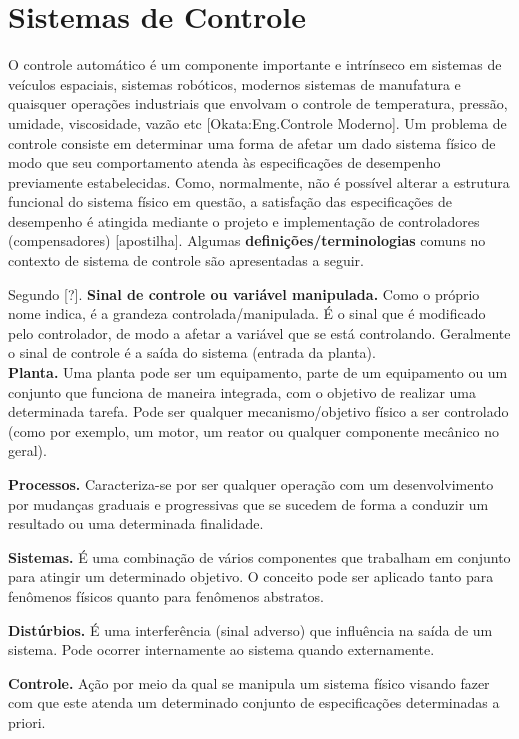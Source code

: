 \section{Sistemas de Controle}

O controle automático é um componente importante e intrínseco em sistemas de veículos espaciais, sistemas robóticos, modernos sistemas de manufatura e quaisquer operações industriais que envolvam o controle de temperatura, pressão, umidade, viscosidade, vazão etc [Okata:Eng.Controle Moderno]. Um problema de controle consiste em determinar uma forma de afetar um dado sistema físico de modo que seu comportamento atenda às especificações de desempenho previamente estabelecidas. Como, normalmente, não é possível alterar a estrutura funcional do sistema físico em questão, a satisfação das especificações de desempenho é atingida mediante o projeto e implementação de controladores (compensadores) [apostilha]. Algumas \textbf{definições/terminologias} comuns no contexto de sistema de controle são apresentadas a seguir.

Segundo [?].
\textbf{Sinal de controle ou variável manipulada.} Como o próprio nome indica, é a grandeza controlada/manipulada. É o sinal que é modificado pelo controlador, de modo a afetar a variável que se está controlando. Geralmente o sinal de controle é a saída do sistema (entrada da planta).\\

\textbf{Planta.} Uma planta pode ser um equipamento, parte de um equipamento ou um conjunto que funciona de maneira integrada, com o objetivo de realizar uma determinada tarefa. Pode ser qualquer mecanismo/objetivo físico a ser controlado (como por exemplo, um motor, um reator ou qualquer componente mecânico no geral).

\textbf{Processos.} Caracteriza-se por ser qualquer operação com um desenvolvimento por mudanças graduais e progressivas que se sucedem de forma a conduzir um resultado ou uma determinada finalidade.

\textbf{Sistemas.} É uma combinação de vários componentes que trabalham em conjunto para atingir um determinado objetivo. O conceito pode ser aplicado tanto para fenômenos físicos quanto para fenômenos abstratos.

\textbf{Distúrbios.} É uma interferência (sinal adverso) que influência na saída de um sistema. Pode ocorrer internamente ao sistema quando externamente.


\textbf{Controle.} Ação por meio da qual se manipula um sistema físico visando fazer com que este atenda um determinado conjunto de especificações determinadas a priori.

